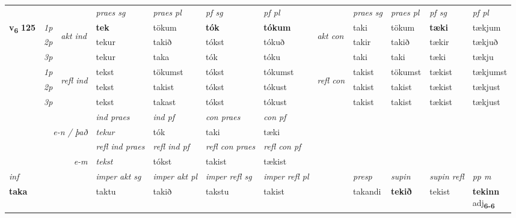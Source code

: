\begin{longtable}[l]{X>{\footnotesize\itshape}llXXXXlXXXX}
 & &   & \textit{praes sg}  & \textit{praes pl}    & \textit{ pf sg} & \textit{pf pl} & & \textit{praes sg}  & \textit{praes pl}    & \textit{pf sg} & \textit{pf pl }  \\ \cmidrule{4-7} \cmidrule{9-12}
 \multirow{2}{*}{{{\textbf{v{\textsubscript{6}}} \Large{\textbf{125}}}}}  & 1p & \multirow{3}{*}{\begin{turn}{90}\textit{akt ind}\end{turn}} & \textbf{tek} & tökum & \textbf{tók} & \textbf{tókum} & \multirow{3}{*}{\begin{turn}{90}\textit{akt con}\end{turn}} &taki & tökum & \textbf{tæki} & tækjum\\*
 & 2p &  &  tekur  & takið & tókst & tókuð & & takir & takið & tækir & tækjuð \\*
 & 3p &  & tekur & taka & tók & tóku & & taki & taki& tæki & tækju \\*
\cmidrule{4-7} \cmidrule{9-12}
 & 1p & \multirow{3}{*}{\begin{turn}{90}\textit{refl ind}\end{turn}}  & tekst & tökumst & tókst & tókumst & \multirow{3}{*}{\begin{turn}{90}\textit{refl con}\end{turn}}  &takist & tökumst & tækist & tækjumst \\*
 & 2p &  & tekst & takist & tókst & tókust & &takist & takist & tækist & tækjust \\*
 & 3p  & & tekst & takast & tókst & tókust & & takist & takist& tækist & tækjust \\*
\cmidrule{4-7} \cmidrule{9-12}

   && &  \textit{ind praes} & \textit{ind pf} & \textit{con praes} & \textit{con pf} \\*
\multicolumn{3}{r}{\textit{e-n / það}} & tekur & tók & taki & tæki \\*

\cmidrule{4-7}
 & && \textit{refl ind praes} & \textit{refl ind pf} & \textit{refl con praes} & \textit{refl con pf} \\*
\multicolumn{3}{r}{\textit{e-m}}& tekst & tókst & takist & tækist \\*

\cmidrule{4-7}
   {\textit{inf}} & &  & \textit{imper akt sg} & \textit{imper akt pl} & \textit{imper refl sg} & \textit{imper refl pl} && \textit{presp} & \textit{supin} & \textit{supin refl} & \textit{pp m} \\*
  {\textbf{taka}} & && taktu  & takið & takstu & takist && takandi &  \textbf{tekið} & tekist & \specialcell{\textbf{tekinn} \\ adj\textbf{\textsubscript{6-6}}} \\*


\end{longtable}
